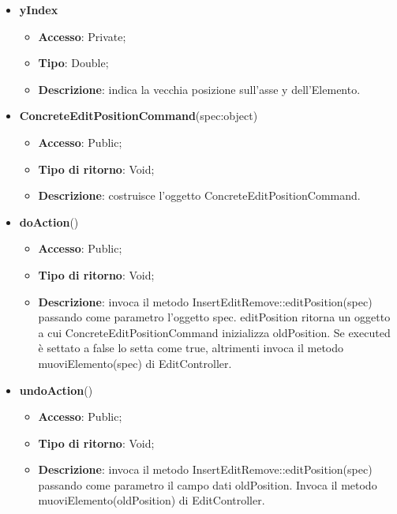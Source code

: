 {{{\begin{itemize}
\begin{itemize}
\begin{itemize}
\begin{itemize}
			\end{itemize}
			\item \textbf{yIndex}
			\begin{itemize}
				\item \textbf{Accesso}: Private;
				\item \textbf{Tipo}: Double;
				\item \textbf{Descrizione}: indica la vecchia posizione sull’asse y dell’Elemento.
			\end{itemize}
		\end{itemize}
			\end{itemize}
			\end{itemize}
		\begin{itemize}
			\item \textbf{ConcreteEditPositionCommand}(spec:object)
			\begin{itemize}
				\item \textbf{Accesso}: Public;
				\item \textbf{Tipo di ritorno}: Void;
				\item \textbf{Descrizione}: costruisce l’oggetto ConcreteEditPositionCommand.
			\end{itemize}
			\item \textbf{doAction}()
			\begin{itemize}
				\item \textbf{Accesso}: Public;
				\item \textbf{Tipo di ritorno}: Void;
				\item \textbf{Descrizione}: invoca il metodo InsertEditRemove::editPosition(spec) passando come parametro l'oggetto spec. editPosition ritorna un oggetto a cui ConcreteEditPositionCommand inizializza oldPosition. Se executed è settato a false lo setta come true, altrimenti invoca il metodo muoviElemento(spec) di EditController.
			\end{itemize}
			\item \textbf{undoAction}()
			\begin{itemize}
				\item \textbf{Accesso}: Public;
				\item \textbf{Tipo di ritorno}: Void;
				\item \textbf{Descrizione}: invoca il metodo InsertEditRemove::editPosition(spec) passando come parametro il campo dati oldPosition. Invoca il metodo muoviElemento(oldPosition) di EditController.
			\end{itemize}
		\end{itemize}
		}
	
}}
